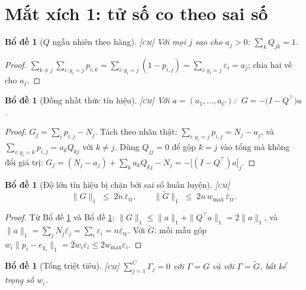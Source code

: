 \documentclass[11pt,a4paper]{article}
\newtheorem{bode}[dinhly]{Bổ đề}
\theoremstyle{remark}
\newcommand{\epstr}{\bar\varepsilon_{\mathrm{tr}}}
\begin{document}
\section{Mắt xích 1: tử số co theo sai số}
\label{sec:tu-so}

\begin{bode}[$Q$ ngẫu nhiên theo hàng]
\label{bd:Qstoch}
\textsc{[cm]}\; Với mọi $j$ sao cho $a_j>0$: $\sum_k Q_{jk}=1$.
\end{bode}

\begin{proof}
$\sum_{k\ne j}\sum_{i:y_i=j}p_{i,k}=\sum_{i:y_i=j}(1-p_{i,j})
=\sum_{i:y_i=j}\varepsilon_i=a_j$; chia hai vế cho $a_j$.
\end{proof}

\begin{bode}[Đồng nhất thức tín hiệu]
\label{bd:tinhieu}
\textsc{[cm]}\; Với $a=(a_1,\dots,a_C)$: $\;G=-\bigl(I-Q^{\!\top}\bigr)a$.
\end{bode}

\begin{proof}
$G_j=\sum_i p_{i,j}-N_j$. Tách theo nhãn thật:
$\sum_{i:y_i=j}p_{i,j}=N_j-a_j$, và $\sum_{i:y_i=k}p_{i,j}=a_kQ_{kj}$ với
$k\ne j$. Dùng $Q_{jj}=0$ để gộp $k=j$ vào tổng mà không đổi giá trị:
$G_j=(N_j-a_j)+\sum_k a_kQ_{kj}-N_j=-\bigl[(I-Q^{\!\top})a\bigr]_j$.
\end{proof}

\begin{bode}[Độ lớn tín hiệu bị chặn bởi sai số huấn luyện]
\label{bd:dolon}
\textsc{[cm]}\;
\begin{equation}
\|G\|_1\;\le\;2n\,\epstr,
\qquad
\|\tilde G\|_1\;\le\;2n\,w_{\max}\,\epstr .
\label{eq:dolon}
\end{equation}
\end{bode}

\begin{proof}
Từ Bổ đề \ref{bd:tinhieu} và Bổ đề \ref{bd:Qstoch}:
$\|G\|_1\le\|a\|_1+\|Q^{\!\top}a\|_1=2\|a\|_1$, và
$\|a\|_1=\sum_j N_j\bar\varepsilon_j=\sum_i\varepsilon_i=n\epstr$. Với
$\tilde G$: mỗi mẫu góp $w_i\|p_i-e_{y_i}\|_1=2w_i\varepsilon_i\le
2w_{\max}\varepsilon_i$.
\end{proof}

\begin{bode}[Tổng triệt tiêu]
\label{bd:tongkhong}
\textsc{[cm]}\; $\sum_{j=1}^{C}\Gamma_j=0$ với $\Gamma=G$ \emph{và} với
$\Gamma=\tilde G$, bất kể trọng số $w_i$.
\end{bode}
\end{document}
